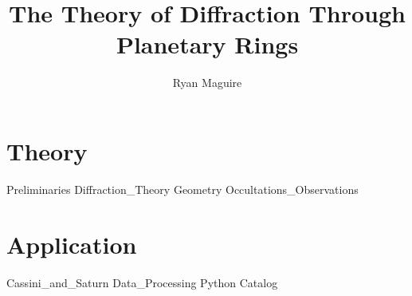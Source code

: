 \documentclass[crop=false,class=book,oneside]{standalone}
\begin{document}
    \newif\ifplanetdiff
    \ifx\ifmain\undefined
        \title{The Theory of Diffraction Through Planetary Rings}
        \author{Ryan Maguire}
        \date{\vspace{-5ex}}
        \maketitle
        \tableofcontents
        \listoffigures
        \listoftables
        \clearpage
    \fi
    \part{Theory}
        {Preliminaries}
        {Diffraction_Theory}
        {Geometry}
        {Occultations_Observations}
    \part{Application}
        {Cassini_and_Saturn}
        {Data_Processing}
        {Python}
        {Catalog}
        \printglossary
\end{document}
